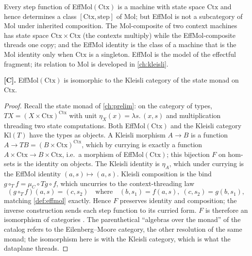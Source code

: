 \begin{remark}
Every step function of EffMol$(\mathrm{Ctx})$ is a machine with state space
$\mathrm{Ctx}$ and hence determines a class $[\mathrm{Ctx}, \mathrm{step}]$
of Mol; but EffMol is not a subcategory of Mol under inherited composition.
The Mol-composite of two context machines has state space
$\mathrm{Ctx} \times \mathrm{Ctx}$ (the contexts multiply) while the
EffMol-composite threads one copy; and the EffMol identity is the class of a
machine that is the Mol identity only when $\mathrm{Ctx}$ is a singleton.
EffMol is the model of the effectful fragment; its relation to Mol is
developed in \autoref{ch:kleisli}.
\end{remark}

\begin{theorem}\label{thm:5}
\textbf{[C].} EffMol$(\mathrm{Ctx})$ is isomorphic to the Kleisli category of
the state monad on $\mathrm{Ctx}$.
\end{theorem}

\begin{proof}
Recall the state monad of \autoref{ch:prelim}: on the category of types,
$T X = (X \times \mathrm{Ctx})^{\mathrm{Ctx}}$ with unit
$\eta_X (x) = \lambda s.\,(x, s)$ and multiplication threading two state
computations. Both EffMol$(\mathrm{Ctx})$ and the Kleisli category
$\mathrm{Kl} (T)$ have the types as objects. A Kleisli morphism $A \to B$ is a
function $A \to T B = (B \times \mathrm{Ctx})^{\mathrm{Ctx}}$, which by
currying is exactly a function $A \times \mathrm{Ctx} \to B \times
\mathrm{Ctx}$, i.e.\ a morphism of EffMol$(\mathrm{Ctx})$; this bijection
$F$ on hom-sets is the identity on objects. The Kleisli identity is
$\eta_A$, which under currying is the EffMol identity $(a, s) \mapsto (a, s)$.
Kleisli composition is the bind $g \circ_T f = \mu_C \circ T g \circ f$, which
uncurries to the context-threading law
\[ (g \circ_T f)(a, s) = (c, s_2) \quad\text{where}\quad (b, s_1) = f (a, s),\; (c, s_2) = g (b, s_1) , \]
matching \autoref{def:effmol} exactly. Hence $F$ preserves identity and
composition; the inverse construction sends each step function to its
curried form. $F$ is therefore an isomorphism of categories
\citep{maclane, arxiv-monads-kleisli}. The parenthetical ``algebras over the
monad'' of the catalog refers to the Eilenberg--Moore category, the other
resolution of the same monad; the isomorphism here is with the Kleisli
category, which is what the dataplane threads.
\end{proof}

